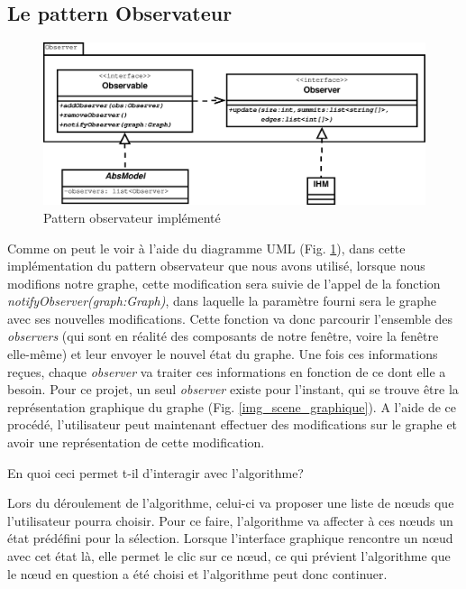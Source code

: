 \documentclass[11pt,a4paper]{article}
\begin{document}
		\subsection{Le pattern Observateur}
			\begin{figure}[htbp]
				\begin{center}
					\includegraphics[scale=0.4]{observer.eps}
				\end{center}
				\caption{Pattern observateur implémenté}
				\label{img_observer}
			\end{figure}
			Comme on peut le voir à l'aide du diagramme UML (Fig. \ref{img_observer}), dans cette implémentation du pattern observateur que nous avons utilisé, lorsque nous modifions notre graphe, cette modification sera suivie de l'appel de la fonction \textit{notifyObserver(graph:Graph)}, dans laquelle la paramètre fourni sera le graphe avec ses nouvelles modifications. Cette fonction va donc parcourir l'ensemble des \textit{observers} (qui sont en réalité des composants de notre fenêtre, voire la fenêtre elle-même) et leur envoyer le nouvel état du graphe. Une fois ces informations reçues, chaque \textit{observer} va traiter ces informations en fonction de ce dont elle a besoin. Pour ce projet, un seul \textit{observer} existe pour l'instant, qui se trouve être la représentation graphique du graphe (Fig. \ref{img_scene_graphique}). 
			A l'aide de ce procédé, l'utilisateur peut maintenant effectuer des modifications sur le graphe et avoir une représentation de cette modification. 
			
			En quoi ceci permet t-il d'interagir avec l'algorithme?
			
			Lors du déroulement de l'algorithme, celui-ci va proposer une liste de n\oe uds que l'utilisateur pourra choisir. Pour ce faire, l'algorithme va affecter à ces n\oe uds un état prédéfini pour la sélection. Lorsque l'interface graphique rencontre un n\oe ud avec cet état là, elle permet le clic sur ce n\oe ud, ce qui prévient l'algorithme que le n\oe ud en question a été choisi et l'algorithme peut donc continuer.
			
\end{document}

